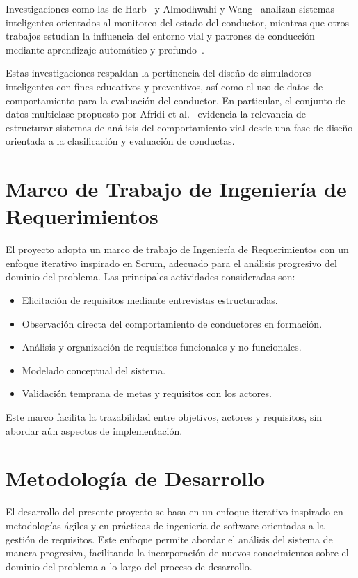 \documentclass[12pt]{article}
\begin{document}
	Investigaciones como las de Harb~\cite{Harb2025} y Almodhwahi y Wang~\cite{Almodhwahi2025} analizan sistemas inteligentes orientados al monitoreo del estado del conductor, mientras que otros trabajos estudian la influencia del entorno vial y patrones de conducción mediante aprendizaje automático y profundo~\cite{Kaselouris202649,Nicolosi2025,Althabhawee2025317}.
	
	Estas investigaciones respaldan la pertinencia del diseño de simuladores inteligentes con fines educativos y preventivos, así como el uso de datos de comportamiento para la evaluación del conductor. En particular, el conjunto de datos multiclase propuesto por Afridi et al.~\cite{Afridi2025} evidencia la relevancia de estructurar sistemas de análisis del comportamiento vial desde una fase de diseño orientada a la clasificación y evaluación de conductas.
	
	\section{Marco de Trabajo de Ingeniería de Requerimientos}
	El proyecto adopta un marco de trabajo de Ingeniería de Requerimientos con un enfoque iterativo inspirado en Scrum, adecuado para el análisis progresivo del dominio del problema.  
	Las principales actividades consideradas son:
	
	\begin{itemize}
		\item Elicitación de requisitos mediante entrevistas estructuradas.
		\item Observación directa del comportamiento de conductores en formación.
		\item Análisis y organización de requisitos funcionales y no funcionales.
		\item Modelado conceptual del sistema.
		\item Validación temprana de metas y requisitos con los actores.
	\end{itemize}
	
	Este marco facilita la trazabilidad entre objetivos, actores y requisitos, sin abordar aún aspectos de implementación.
    \section{Metodología de Desarrollo}

El desarrollo del presente proyecto se basa en un enfoque iterativo inspirado en metodologías ágiles y en prácticas de ingeniería de software orientadas a la gestión de requisitos. Este enfoque permite abordar el análisis del sistema de manera progresiva, facilitando la incorporación de nuevos conocimientos sobre el dominio del problema a lo largo del proceso de desarrollo.
\end{document}
